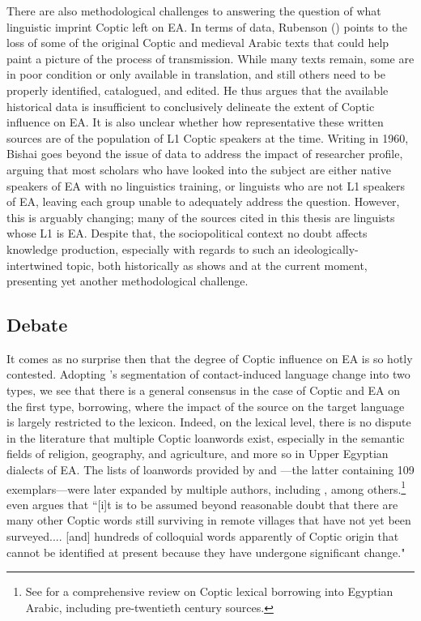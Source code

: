 \documentclass[12pt,a4paper]{article}
\begin{document}
There are also methodological challenges to answering the question of what linguistic imprint Coptic left on EA. In terms of data, Rubenson (\citeyear{rubenson_transition_1996}) points to the loss of some of the original Coptic and medieval Arabic texts that could help paint a picture of the process of transmission. While many texts remain, some are in poor condition or only available in translation, and still others need to be properly identified, catalogued, and edited. He thus argues that the available historical data is insufficient to conclusively delineate the extent of Coptic influence on EA. It is also unclear whether how representative these written sources are of the population of L1 Coptic speakers at the time. Writing in 1960, Bishai goes beyond the issue of data to address the impact of researcher profile, arguing that most scholars who have looked into the subject are either native speakers of EA with no linguistics training, or linguists who are not L1 speakers of EA, leaving each group unable to adequately address the question. However, this is arguably changing; many of the sources cited in this thesis are linguists whose L1 is EA. Despite that, the sociopolitical context no doubt affects knowledge production, especially with regards to such an ideologically-intertwined topic, both historically as \textcite{osman_methodological_2021} shows and at the current moment, presenting yet another methodological challenge.

\subsection{Debate}
\label{subsec:debate}

It comes as no surprise then that the degree of Coptic influence on EA is so hotly contested. Adopting \textcite{thomason_language_1988}'s segmentation of contact-induced language change into two types, we see that there is a general consensus in the case of Coptic and EA on the first type, borrowing, where the impact of the source on the target language is largely restricted to the lexicon. Indeed, on the lexical level, there is no dispute in the literature that multiple Coptic loanwords exist, especially in the semantic fields of religion, geography, and agriculture, and more so in Upper Egyptian dialects of EA. The lists of loanwords provided by \textcite{sobhy_common_1950} and \textcite{bishai_coptic_1964}---the latter containing 109 exemplars---were later expanded by multiple authors, including \textcite{ishaq_egyptian_1991, hinds_dictionary_1986, behnstedt_coptic_2011, corriente_coptic_2008}, among others.\footnote{See \textcite{hinds_dictionary_1986, osman_methodological_2021} for a comprehensive review on Coptic lexical borrowing into Egyptian Arabic, including pre-twentieth century sources.} \textcite[112]{ishaq_egyptian_1991} even argues that ``[i]t is to be assumed beyond reasonable doubt that there are many other Coptic words still surviving in remote villages that have not yet been surveyed.... [and] hundreds of colloquial words apparently of Coptic origin that cannot be identified at present because they have undergone significant change." 
\end{document}
